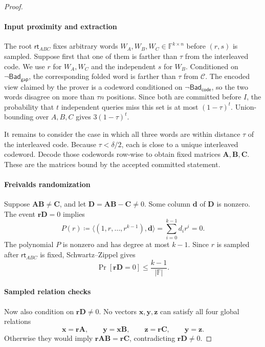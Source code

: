 \documentclass[conference,compsoc]{IEEEtran}
\newcommand{\rt}{\textsf{rt}}
\newcommand{\mat}{\mathbf}          %
\newcommand{\vect}{\mathbf}         %
\theoremstyle{plain}
\theoremstyle{definition}
\theoremstyle{remark}
\providecommand{\DIFaddtex}[1]{{\protect\color{DIFADD} \sf #1}} %
\providecommand{\DIFaddbegin}{} %
\providecommand{\DIFaddend}{} %
\providecommand{\DIFadd}[1]{\texorpdfstring{\DIFaddtex{#1}}{#1}} %
\providecommand{\DIFaddincludegraphics}[2][]{{\color{blue}\fbox{\DIFOincludegraphics[#1]{#2}}}} %
\DeclareRobustCommand{\DIFaddbegin}{\DIFOaddbegin \let\includegraphics\DIFaddincludegraphics} %
\DeclareRobustCommand{\DIFaddend}{\DIFOaddend \let\includegraphics\DIFOincludegraphics} %
\begin{document}
\begin{proof}
\paragraph{ \DIFaddbegin \DIFadd{Input proximity and extraction}\DIFaddend }
The  root \(\rt_{ABC}\)  \DIFaddbegin \DIFadd{fixes arbitrary words
\(W_A,W_B,W_C\in\mathbb{F}^{k\times n}\) before \((r,s)\) is sampled.
Suppose first that one of them is farther than \(\tau\) from the interleaved
code.  We use }\DIFaddend \(r\)  \DIFaddbegin \DIFadd{for \(W_A,W_C\) and the independent \(s\) for \(W_B\).
Conditioned on \(\neg\mathsf{Bad}_{\mathsf{gap}}\), the corresponding folded
word is farther than \(\tau\) from \(\mathcal{C}\).  The encoded view claimed
by the prover is a codeword conditioned on
\(\neg\mathsf{Bad}_{\mathsf{code}}\), so the two words disagree on more than
\(\tau n\) positions.  Since both are committed before \(I\), the probability
that \(t\) independent queries miss this set is at most \((1-\tau)^t\).
Union-bounding over \(A,B,C\) gives \(3(1-\tau)^t\).
}

\DIFadd{It remains to consider the case in which all three words are within distance
\(\tau\) of the interleaved code.  Because \(\tau<\delta/2\), each is close
to a unique interleaved codeword.  Decode those codewords }\DIFaddend row-wise  \DIFaddbegin \DIFadd{to obtain
fixed }\DIFaddend matrices \(\mat{A},\mat{B},\mat{C}\).  \DIFaddbegin \DIFadd{These are the matrices bound by
the accepted committed statement.
}

\paragraph{\DIFadd{Freivalds randomization}}
\DIFaddend Suppose \(\mat{A}\mat{B}\neq\mat{C}\), and let
\(\mat{D}=\mat{A}\mat{B}-\mat{C}\neq 0\).  Some column
\(\vect{d}\) of \(\mat{D}\) is nonzero.  The event
\(\vect{r}\mat{D}=0\) implies
\[
  P(r)
  \coloneqq
  \langle (1,r,\ldots,r^{k-1}),\vect{d}\rangle
  =
  \sum_{i=0}^{k-1} d_i r^i
  =
  0 .
\]
The polynomial \(P\) is nonzero and has degree at most \(k-1\).  Since \(r\)
is sampled after \(\rt_{ABC}\) is fixed, Schwartz--Zippel gives
\[
  \Pr[\vect{r}\mat{D}=0]
  \le
  \frac{k-1}{|\mathbb{F}|}.
\]

\paragraph{ \DIFaddbegin \DIFadd{Sampled relation checks}\DIFaddend }
Now also condition on \(\vect{r}\mat{D}\neq 0\).  No vectors
\(\vect{x},\vect{y},\vect{z}\) can satisfy all four global relations
\[
  \vect{x}=\vect{r}\mat{A},
  \qquad
  \vect{y}=\vect{x}\mat{B},
  \qquad
  \vect{z}=\vect{r}\mat{C},
  \qquad
  \vect{y}=\vect{z}.
\]
Otherwise they would imply
\(\vect{r}\mat{A}\mat{B}=\vect{r}\mat{C}\), contradicting
\(\vect{r}\mat{D}\neq 0\).


\end{proof}
\end{document}
